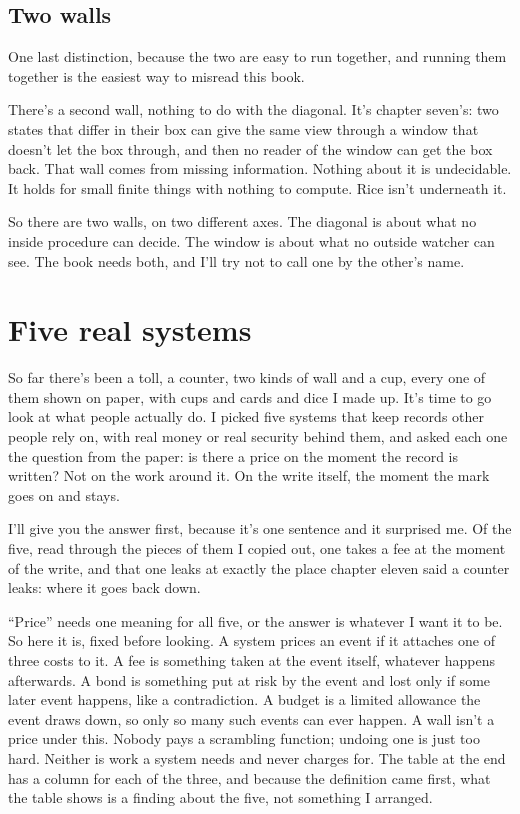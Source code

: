 \documentclass[11pt,twoside]{article}
\theoremstyle{thielethm}
\theoremstyle{thieledef}
\theoremstyle{thieledef}
\theoremstyle{thieledef}
\theoremstyle{thielethm}
\theoremstyle{thieleobs}
\theoremstyle{thielethm}
\begin{document}
\subsection{Two walls}

One last distinction, because the two are easy to run together, and running them together is the easiest way to misread this book.

There's a second wall, nothing to do with the diagonal. It's chapter seven's: two states that differ in their box can give the same view through a window that doesn't let the box through, and then no reader of the window can get the box back. That wall comes from missing information. Nothing about it is undecidable. It holds for small finite things with nothing to compute. Rice isn't underneath it.

So there are two walls, on two different axes. The diagonal is about what no inside procedure can decide. The window is about what no outside watcher can see. The book needs both, and I'll try not to call one by the other's name.

\section{Five real systems}
\label{sec:five-systems}

So far there's been a toll, a counter, two kinds of wall and a cup, every one of them shown on paper, with cups and cards and dice I made up. It's time to go look at what people actually do. I picked five systems that keep records other people rely on, with real money or real security behind them, and asked each one the question from the paper: is there a price on the moment the record is written? Not on the work around it. On the write itself, the moment the mark goes on and stays.

I'll give you the answer first, because it's one sentence and it surprised me. Of the five, read through the pieces of them I copied out, one takes a fee at the moment of the write, and that one leaks at exactly the place chapter eleven said a counter leaks: where it goes back down.

``Price'' needs one meaning for all five, or the answer is whatever I want it to be. So here it is, fixed before looking. A system prices an event if it attaches one of three costs to it. A fee is something taken at the event itself, whatever happens afterwards. A bond is something put at risk by the event and lost only if some later event happens, like a contradiction. A budget is a limited allowance the event draws down, so only so many such events can ever happen. A wall isn't a price under this. Nobody pays a scrambling function; undoing one is just too hard. Neither is work a system needs and never charges for. The table at the end has a column for each of the three, and because the definition came first, what the table shows is a finding about the five, not something I arranged.
\end{document}
